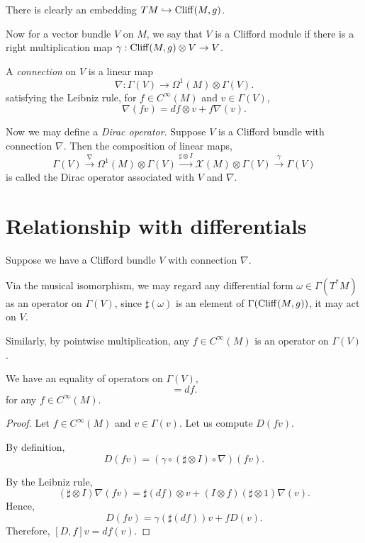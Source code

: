 There is clearly an embedding $TM \hookrightarrow \operatorname{Cliff}(M,g)$. 

Now for a vector bundle $V$ on $M$, we say that $V$ is a Clifford module
if there is a right multiplication map $\gamma:\operatorname{Cliff}(M,g) \otimes V\rightarrow V$. 

A \emph{connection} on $V$ is a linear map
\begin{equation}
    \nabla:\Gamma(V)\rightarrow \Omega^1(M)\otimes \Gamma(V).
\end{equation}
satisfying the Leibniz rule, for $f \in C^\infty(M)$ and $v \in \Gamma(V)$,
\begin{equation}
    \nabla(fv) = df \otimes v +f\nabla(v).
\end{equation}

Now we may define a \emph{Dirac operator}. Suppose $V$
is a Clifford bundle with connection $\nabla$. Then the composition of linear maps,
\begin{equation}
    \Gamma(V) \xrightarrow{\nabla} \Omega^1(M) \otimes \Gamma(V) \xrightarrow{\sharp\otimes I} \mathcal{X}(M)\otimes \Gamma(V) \xrightarrow{\gamma} \Gamma(V)
\end{equation}
is called the Dirac operator associated with $V$ and $\nabla$. 

\section{Relationship with differentials}
Suppose we have a Clifford bundle $V$ with connection $\nabla$. 

Via the musical isomorphism, we may regard any differential form $\omega \in \Gamma(T^*M)$
as an operator on $\Gamma(V)$, since $\sharp(\omega)$ is an element of $\Gamma(\operatorname{Cliff}(M,g))$,
it may act on $V$.

Similarly, by pointwise multiplication, any $f \in C^\infty(M)$ is an operator
on $\Gamma(V)$. 
\begin{theorem}
    We have an equality of operators on $\Gamma(V)$,
    \begin{equation}
        [D,f] = df.
    \end{equation}
    for any $f \in C^\infty(M)$.
\end{theorem}
\begin{proof}
    Let $f \in C^\infty(M)$ and $v \in \Gamma(v)$. Let 
    us compute $D(fv)$.
    
    By definition,
    \begin{equation}
        D(fv) = (\gamma\circ(\sharp\otimes I)\circ\nabla)(fv).
    \end{equation}
    
    By the Leibniz rule,
    \begin{equation}
        (\sharp\otimes I)\nabla(fv) = \sharp(df)\otimes v + (I\otimes f)(\sharp \otimes 1)\nabla(v).
    \end{equation}
    Hence,
    \begin{equation}
        D(fv) = \gamma(\sharp(df))v + fD(v).
    \end{equation}
    Therefore, $[D,f]v = df(v)$.
\end{proof}
